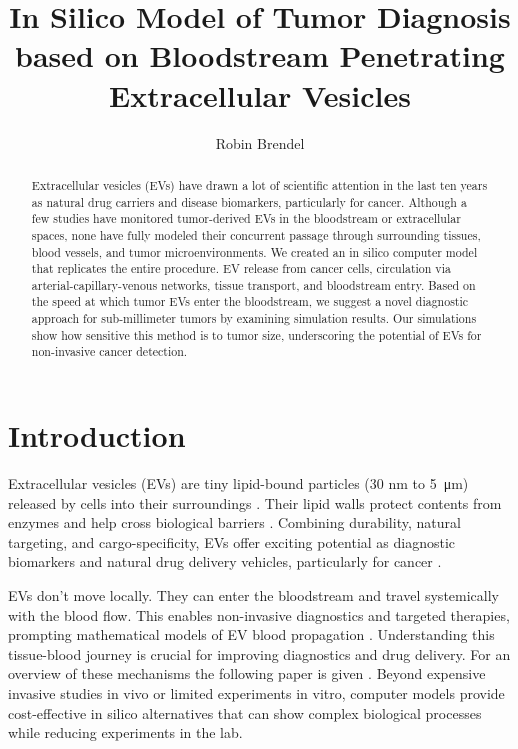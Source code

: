 \documentclass[sigconf]{acmart}
\begin{document}
\title{In Silico Model of Tumor Diagnosis based on Bloodstream Penetrating Extracellular Vesicles}
\author{Robin Brendel}

\begin{abstract}
Extracellular vesicles (EVs) have drawn a lot of scientific attention in the last ten years as natural drug carriers and disease biomarkers, particularly for cancer. Although a few studies have monitored tumor-derived EVs in the bloodstream or extracellular spaces, none have fully modeled their concurrent passage through surrounding tissues, blood vessels, and tumor microenvironments. We created an in silico computer model that replicates the entire procedure. EV release from cancer cells, circulation via arterial-capillary-venous networks, tissue transport, and bloodstream entry. Based on the speed at which tumor EVs enter the bloodstream, we suggest a novel diagnostic approach for sub-millimeter tumors by examining simulation results. Our simulations show how sensitive this method is to tumor size, underscoring the potential of EVs for non-invasive cancer detection. 
\end{abstract}


\maketitle

\section{Introduction}
\label{sec: introduction}
Extracellular vesicles (EVs) are tiny lipid-bound particles (30 nm to \SI{5}{\micro\meter}) released by cells into their surroundings \cite{Doyle_2019}. Their lipid walls protect contents from enzymes and help cross biological barriers \cite{Arjmandi_2021}. Combining durability, natural targeting, and cargo-specificity, EVs offer exciting potential as diagnostic biomarkers and natural drug delivery vehicles, particularly for cancer \cite{Doyle_2019}.

EVs don't move locally. They can enter the bloodstream and travel systemically with the blood flow. This enables non-invasive diagnostics and targeted therapies, prompting mathematical models of EV blood propagation \cite{Ferguson_2020}. Understanding this tissue-blood journey is crucial for improving diagnostics and drug delivery. For an overview of these mechanisms the following paper is given \cite{Sykov__2008}. Beyond expensive invasive studies in vivo or limited experiments in vitro, computer models provide cost-effective in silico alternatives that can show complex biological processes while reducing experiments in the lab. 
\end{document}
